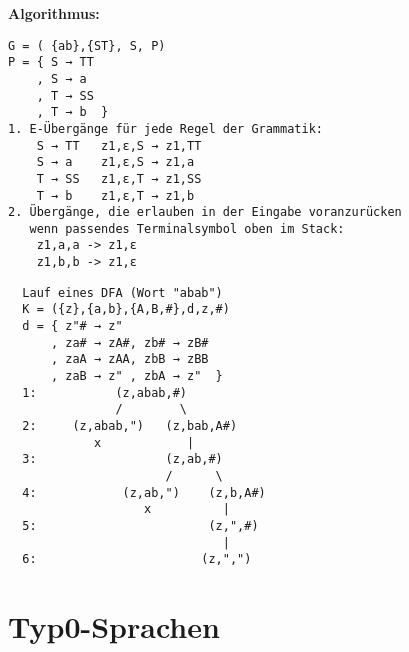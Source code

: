 \documentclass[11pt,
			a4paper,
			parskip=full,
			toc=bib,
			toc=idx,
			toc=listof,
			ngerman
			listof=totoc,]{scrartcl}
\newcommand{\concept}[1]{%
	\sf{%
		\textbf{%
				\textcolor{mymauve}{#1}%
		}%
	}%
	\rm%
}
\newenvironment{algo}[1]%
{	\begin{framed}
	\textbf{Algorithmus:} \concept{#1}}%
{\end{framed}}
\newenvironment{expl}%
{\color{red}}
{\color{black}}
\newcommand{\compress}{\vspace{-1em}}
\begin{document}
\begin{minipage}[t]{1\linewidth}
  \begin{minipage}[t]{0.6\linewidth}
    \begin{algo}{ktxf.Grammatik → Kellerautomat}
	\compress
      \begin{verbatim}
G = ( {ab},{ST}, S, P)
P = { S → TT
    , S → a 
    , T → SS
    , T → b  }
1. E-Übergänge für jede Regel der Grammatik:
    S → TT   z1,ε,S → z1,TT
    S → a    z1,ε,S → z1,a
    T → SS   z1,ε,T → z1,SS
    T → b    z1,ε,T → z1,b
2. Übergänge, die erlauben in der Eingabe voranzurücken
   wenn passendes Terminalsymbol oben im Stack:
    z1,a,a -> z1,ε
    z1,b,b -> z1,ε
      \end{verbatim}
	\compress
    \end{algo}
	\compress
  \end{minipage}
  \begin{minipage}[t]{0.4\linewidth}
    \begin{expl}
      \begin{verbatim}
  Lauf eines DFA (Wort "abab")
  K = ({z},{a,b},{A,B,#},d,z,#)
  d = { z"# → z"
      , za# → zA#, zb# → zB#
      , zaA → zAA, zbB → zBB
      , zaB → z" , zbA → z"  }              
  1:           (z,abab,#)
               /        \
  2:     (z,abab,")   (z,bab,A#)
            x            |
  3:                  (z,ab,#)
                      /      \
  4:            (z,ab,")    (z,b,A#)
                   x          |
  5:                        (z,",#)
                              |
  6:                       (z,",")
      \end{verbatim}
    \end{expl}
  \end{minipage}
\end{minipage}













\compress
\compress
\section{Typ0-Sprachen}
\end{document}
